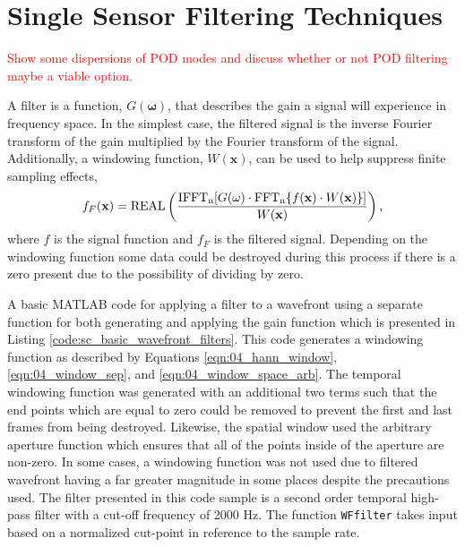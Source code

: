 
\chapter{Single Sensor Filtering Techniques}

\textcolor{red}{Show some dispersions of POD modes and discuss whether or not POD filtering maybe a viable option.}

A filter is a function, $G(\mathbf{\omega})$, that describes the gain a signal will experience in frequency space.
In the simplest case, the filtered signal is the inverse Fourier transform of the gain multiplied by the Fourier transform of the signal.
Additionally, a windowing function, $W(\mathbf{x})$, can be used to help suppress finite sampling effects,
\begin{equation}
 f_F(\mathbf{x}) = \operatorname{REAL}\left(\frac{\operatorname{IFFT_n}[G(\mathbf{\omega})\cdot\operatorname{FFT_n}\{f(\mathbf{x})\cdot W(\mathbf{x})\}]}{W(\mathbf{x})}\right) \textrm{,}
 \label{eqn:06_filter_function}
\end{equation}
where $f$ is the signal function and $f_F$ is the filtered signal.
Depending on the windowing function some data could be destroyed during this process if there is a zero present due to the possibility of dividing by zero.

A basic MATLAB code for applying a filter to a wavefront using a separate function for both generating and applying the gain function which is presented in Listing \ref{code:sc_basic_wavefront_filters}.
This code generates a windowing function as described by Equations \ref{eqn:04_hann_window}, \ref{eqn:04_window_sep}, and \ref{eqn:04_window_space_arb}.
The temporal windowing function was generated with an additional two terms such that the end points which are equal to zero could be removed to prevent the first and last frames from being destroyed.
Likewise, the spatial window used the arbitrary aperture function which ensures that all of the points inside of the aperture are non-zero.
In some cases, a windowing function was not used due to filtered wavefront having a far greater magnitude in some places despite the precautions used.
The filter presented in this code sample is a second order temporal high-pass filter with a cut-off frequency of 2000 Hz.
The function \lstinline{WFfilter} takes input based on a normalized cut-point in reference to the sample rate.

